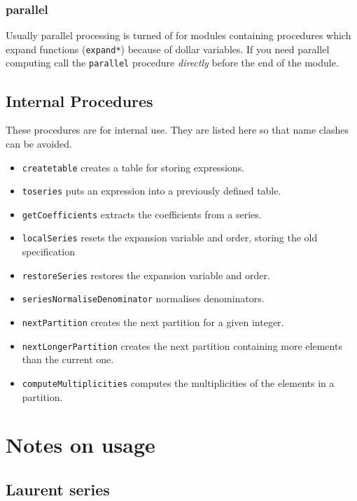 \documentclass[titlepage]{article}
\begin{document}
\subsubsection{parallel}
\label{sec:parallel}

Usually parallel processing is turned of for modules containing
procedures which expand functions ({\tt expand*}) because of
dollar variables. If you need
parallel computing call the {\tt parallel} procedure {\em directly}
  before the end of the module.

\subsection{Internal Procedures}
\label{sec:proc_internal}
These procedures are for internal use. They are listed here so that name
clashes can be avoided.
\begin{itemize}
\item {\tt createtable} creates a table for storing expressions.
\item {\tt toseries} puts an expression into a previously defined table.
\item {\tt getCoefficients} extracts the coefficients from a series.
\item {\tt localSeries} resets the expansion variable and order, storing
  the old specification
\item {\tt restoreSeries} restores the expansion variable and order.
\item \texttt{seriesNormaliseDenominator} normalises denominators.
\item {\tt nextPartition} creates the next partition for a given integer.
\item {\tt nextLongerPartition} creates the next partition containing
  more elements than the current one.
\item {\tt computeMultiplicities} computes the multiplicities of the
  elements in a partition.
\end{itemize}

\section{Notes on usage}
\label{sec:usage_notes}

\subsection{Laurent series}
\label{sec:laurent}
\end{document}
